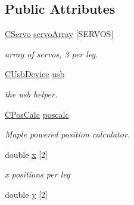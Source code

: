 \subsection*{Public Attributes}
\begin{DoxyCompactItemize}
\item 
\hypertarget{class_c_q_ped_a33d7137c5d392fd900654921e4a7eb3b}{
\hyperlink{class_c_servo}{CServo} \hyperlink{class_c_q_ped_a33d7137c5d392fd900654921e4a7eb3b}{servoArray} \mbox{[}SERVOS\mbox{]}}
\label{class_c_q_ped_a33d7137c5d392fd900654921e4a7eb3b}

\begin{DoxyCompactList}\small\item\em array of servos, 3 per leg. \item\end{DoxyCompactList}\item 
\hypertarget{class_c_q_ped_ac32d01b945471e4a4b752830ca7b8a57}{
\hyperlink{class_c_usb_device}{CUsbDevice} \hyperlink{class_c_q_ped_ac32d01b945471e4a4b752830ca7b8a57}{usb}}
\label{class_c_q_ped_ac32d01b945471e4a4b752830ca7b8a57}

\begin{DoxyCompactList}\small\item\em the usb helper. \item\end{DoxyCompactList}\item 
\hypertarget{class_c_q_ped_a066bfd6ea8a409f3db09c329696ab3fd}{
\hyperlink{class_c_pos_calc}{CPosCalc} \hyperlink{class_c_q_ped_a066bfd6ea8a409f3db09c329696ab3fd}{poscalc}}
\label{class_c_q_ped_a066bfd6ea8a409f3db09c329696ab3fd}

\begin{DoxyCompactList}\small\item\em Maple powered position calculator. \item\end{DoxyCompactList}\item 
\hypertarget{class_c_q_ped_a1456fc9cb85141946f1e21ef6ce86998}{
double \hyperlink{class_c_q_ped_a1456fc9cb85141946f1e21ef6ce86998}{x} \mbox{[}2\mbox{]}}
\label{class_c_q_ped_a1456fc9cb85141946f1e21ef6ce86998}

\begin{DoxyCompactList}\small\item\em x positions per leg \item\end{DoxyCompactList}\item 
\hypertarget{class_c_q_ped_a25b4894a78e003731ce7a20ae57b0cf7}{
double \hyperlink{class_c_q_ped_a25b4894a78e003731ce7a20ae57b0cf7}{y} \mbox{[}2\mbox{]}}
\label{class_c_q_ped_a25b4894a78e003731ce7a20ae57b0cf7}


\end{DoxyCompactItemize}
